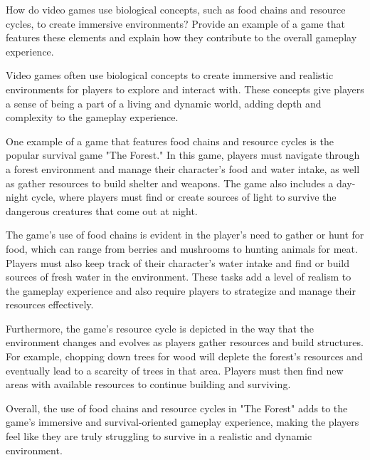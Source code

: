 \question How do video games use biological concepts, such as food chains and resource cycles, to create immersive environments? Provide an example of a game that features these elements and explain how they contribute to the overall gameplay experience.
\begin{solution}
Video games often use biological concepts to create immersive and realistic environments for players to explore and interact with. These concepts give players a sense of being a part of a living and dynamic world, adding depth and complexity to the gameplay experience.

One example of a game that features food chains and resource cycles is the popular survival game "The Forest." In this game, players must navigate through a forest environment and manage their character's food and water intake, as well as gather resources to build shelter and weapons. The game also includes a day-night cycle, where players must find or create sources of light to survive the dangerous creatures that come out at night.

The game's use of food chains is evident in the player's need to gather or hunt for food, which can range from berries and mushrooms to hunting animals for meat. Players must also keep track of their character's water intake and find or build sources of fresh water in the environment. These tasks add a level of realism to the gameplay experience and also require players to strategize and manage their resources effectively.

Furthermore, the game's resource cycle is depicted in the way that the environment changes and evolves as players gather resources and build structures. For example, chopping down trees for wood will deplete the forest's resources and eventually lead to a scarcity of trees in that area. Players must then find new areas with available resources to continue building and surviving.

Overall, the use of food chains and resource cycles in "The Forest" adds to the game's immersive and survival-oriented gameplay experience, making the players feel like they are truly struggling to survive in a realistic and dynamic environment.
\end{solution}
